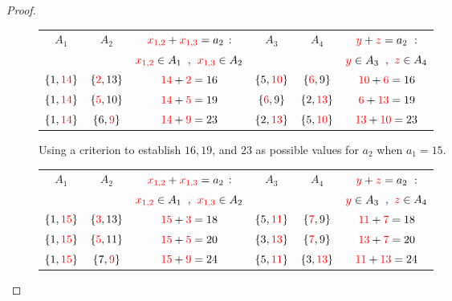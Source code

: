 \documentclass[10pt,a4paper]{amsart}
\begin{document}
\begin{proof}
\begin{figure}[hbt!]
    \centering
\renewcommand{\arraystretch}{1.5}
\begin{tabular}{|c|c|c|c|c|c|} \hline
$A_1$ & $A_2$  & $\textcolor{red}{x_{1,2}}+\textcolor{red}{x_{1,3}}=a_2$ : & $A_3$ &  $A_4$ & $\textcolor{red}{y}+\textcolor{red}{z} = a_2\ :$\\ 
      &            &   $\textcolor{red}{x_{1,2}}\in A_1$\ ,\ $\textcolor{red}{x_{1,3}}\in A_2$                                      &      &    &
$\textcolor{red}{y}\in A_3$\ ,\ $\textcolor{red}{z}\in A_4$ \\  \hline
$\{1, \textcolor{red}{14}\}$ & $\{\textcolor{red}{2}, 13\}$ & $\textcolor{red}{14}+\textcolor{red}{2}=16$ & $\{ 5,\textcolor{red}{10}\}$ &  $\{ \textcolor{red}{6}, 9  \}$ &  $\textcolor{red}{10}+\textcolor{red}{6}=16$\\  \hline
$\{1,\textcolor{red}{14}\}$ & $\{\textcolor{red}{5}, 10\}$ & $\textcolor{red}{14}+\textcolor{red}{5}=19$ & $\{ \textcolor{red}{6}, 9 \}$ &  $\{2, \textcolor{red}{13}  \}$ &  $\textcolor{red}{6}+\textcolor{red}{13}=19$\\  \hline
$\{1, \textcolor{red}{14}\}$ & $\{6, \textcolor{red}{9}\}$ & $\textcolor{red}{14}+\textcolor{red}{9}=23$ & $\{ 2,\textcolor{red}{13}\}$ &  $\{ 5, \textcolor{red}{10}  \}$ &  $\textcolor{red}{13}+\textcolor{red}{10}=23$\\  \hline
\end{tabular}
    
    \caption{Using a criterion to establish $16, 19$, and $23$ as possible values for $a_2$ when $a_1=15$.}
    \label{establish_a2_valuesais15}
\end{figure}

\begin{figure}[hbt!]
    \centering
\renewcommand{\arraystretch}{1.5}
\begin{tabular}{|c|c|c|c|c|c|} \hline
$A_1$ & $A_2$  & $\textcolor{red}{x_{1,2}}+\textcolor{red}{x_{1,3}}=a_2$ : & $A_3$ &  $A_4$ & $\textcolor{red}{y}+\textcolor{red}{z} = a_2\ :$\\ 
      &            &   $\textcolor{red}{x_{1,2}}\in A_1$\ ,\ $\textcolor{red}{x_{1,3}}\in A_2$                                      &      &    &
$\textcolor{red}{y}\in A_3$\ ,\ $\textcolor{red}{z}\in A_4$ \\  \hline
$\{1, \textcolor{red}{15}\}$ & $\{\textcolor{red}{3}, 13\}$ & $\textcolor{red}{15}+\textcolor{red}{3}=18$ & $\{ 5,\textcolor{red}{11}\}$ &  $\{ \textcolor{red}{7}, 9  \}$ &  $\textcolor{red}{11}+\textcolor{red}{7}=18$\\  \hline
$\{1,\textcolor{red}{15}\}$ & $\{\textcolor{red}{5}, 11\}$ & $\textcolor{red}{15}+\textcolor{red}{5}=20$ & $\{ 3,\textcolor{red}{13}\}$ &  $\{ \textcolor{red}{7}, 9  \}$ &  $\textcolor{red}{13}+\textcolor{red}{7}=20$\\  \hline
$\{1, \textcolor{red}{15}\}$ & $\{7, \textcolor{red}{9}\}$ & $\textcolor{red}{15}+\textcolor{red}{9}=24$ & $\{ 5,\textcolor{red}{11}\}$ &  $\{ 3, \textcolor{red}{13}  \}$ &  $\textcolor{red}{11}+\textcolor{red}{13}=24$\\  \hline
\end{tabular}
    

\end{figure}
\end{proof}
\end{document}
